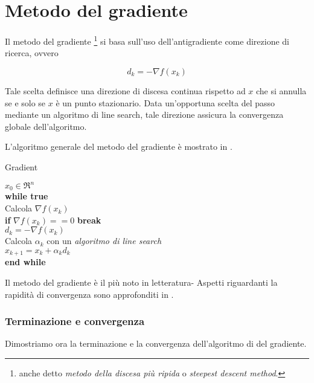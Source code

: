 \chapter{Metodo del gradiente}
\label{chp:methods.gradient}
Il metodo del gradiente \footnote{anche detto \textit{metodo della discesa più ripida} o \textit{steepest descent method}.} si basa sull'uso dell'antigradiente
come direzione di ricerca, ovvero

\begin{equation*}
\label{eqn.methods.gradient.direction}
  d_{k}=-\nabla f(x_{k})
\end{equation*}

Tale scelta definisce una direzione di discesa continua rispetto ad $x$ che si
annulla se e solo se $x$ è un punto stazionario. Data un'opportuna scelta del
passo mediante un algoritmo di line search, tale direzione assicura la
convergenza globale dell'algoritmo.

L'algoritmo generale del metodo del gradiente è mostrato in
.

\begin{algorithm}
\label{alg:methods.gradient}
\caption{Gradient}
  $x_{0}\in\Re^{n}$ \\
  \textbf{while true} \\
  Calcola $\nabla f(x_{k})$ \\
  \textbf{if} $\nabla f(x_{k}) == 0$ \textbf{break} \\
  $d_{k}=-\nabla f(x_{k})$ \\
  Calcola $\alpha_{k}$ con un \textit{algoritmo di line search} \\
  $x_{k+1}=x_{k}+\alpha_{k}d_{k}$ \\
  \textbf{end while} \\
\end{algorithm}

Il metodo del gradiente è il più noto in letteratura- Aspetti riguardanti la rapidità di convergenza sono approfonditi in \cite{bertsekas1999nonlinear}.


\subsection{Terminazione e convergenza}
\label{sec:methods.gradient.termination.convergence}
Dimostriamo ora la terminazione e la convergenza dell'algoritmo di del gradiente.

